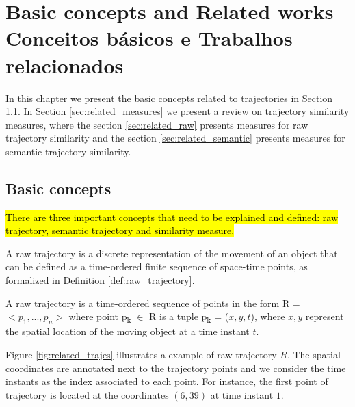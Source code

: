 

\chapter[\lang{Basic concepts and Related works}{Conceitos básicos e Trabalhos relacionados}]
{
    \lang
    {Basic concepts and Related works}
    {Conceitos básicos e Trabalhos relacionados}
}
\label{sec:related}

\begin{flushright}
    \englishword{ }
\end{flushright}


In this chapter we present the basic concepts related to trajectories in Section \ref{sec:basic_concepts}. In Section \ref{sec:related_measures} we present a review on trajectory similarity measures, where the section \ref{sec:related_raw} presents measures for raw trajectory similarity and the section \ref{sec:related_semantic} presents measures for semantic trajectory similarity.

\section{Basic concepts} \label{sec:basic_concepts}
\hl{There are three important concepts that need to be explained and defined: raw trajectory, semantic trajectory and similarity measure.}

A raw trajectory is a discrete representation of the movement of an object that can be defined as a time-ordered finite sequence of space-time points, as formalized in Definition \ref{def:raw_trajectory}. 

\begin{definition} \label{def:raw_trajectory}
A raw trajectory is a time-ordered sequence of points in the form R = $<p_1,...,p_n>$ where point p\textsubscript{k} $\in$ R is a tuple p\textsubscript{k} = ($x,y,t$), where $x,y$ represent the spatial location of the moving object at a time instant $t$.
\end{definition}

Figure \ref{fig:related_trajes} illustrates a example of raw trajectory $R$. The spatial coordinates are annotated next to the trajectory points and we consider the time instants as the index associated to each point. For instance, the first point of trajectory is located at the coordinates $(6,39)$ at time instant $1$.

